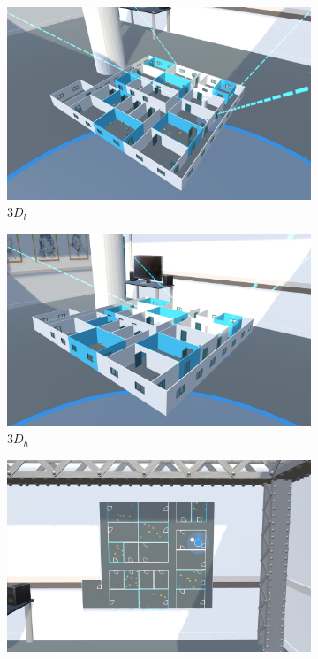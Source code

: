\begin{figure}[h]
    \begin{subfigure}{0.32\linewidth}
        \centering
        \includegraphics[width=\linewidth]{figures/screenshots/condition_3d_l_x}
        \caption{$3D_l$}
    \end{subfigure}%
    \hfill
    \begin{subfigure}{0.32\linewidth}
        \centering
        \includegraphics[width=\linewidth]{figures/screenshots/condition_3d_h_x}
        \caption{$3D_h$}
    \end{subfigure}%
    \hfill
    \begin{subfigure}{0.32\linewidth}
        \centering
        \includegraphics[width=\linewidth]{figures/screenshots/condition_2d_x}

\end{subfigure}
\end{figure}

